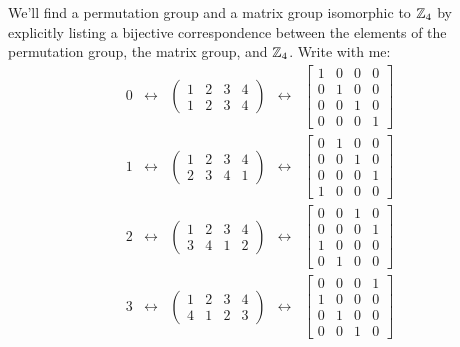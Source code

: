 \documentclass{ximera}
\begin{document}
\begin{example}
  We'll find a permutation group and a matrix group isomorphic to
  $\mathbb Z_4$ by explicitly listing a bijective correspondence between the
  elements of the permutation group, the matrix group, and $\mathbb Z_4$.
  Write with me:
  \[
  \renewcommand{\arraystretch}{2.5}
  \begin{array}{ccccc}
    0 & \leftrightarrow & \left(\begin{smallmatrix}1 & 2 & 3 & 4 \\ 1 & 2 & 3 & 4\end{smallmatrix}\right) & \leftrightarrow & \left[\begin{smallmatrix} 1 & 0 & 0 & 0 \\ 0 & 1 & 0 & 0 \\ 0 & 0 & 1 & 0 \\ 0 & 0 & 0 & 1 \end{smallmatrix}\right]\\
    1 & \leftrightarrow & \left(\begin{smallmatrix}1 & 2 & 3 & 4 \\ 2 & 3 & 4 & 1\end{smallmatrix}\right) & \leftrightarrow & \left[\begin{smallmatrix} 0 & 1 & 0 & 0 \\ 0 & 0 & 1 & 0 \\ 0 & 0 & 0 & 1 \\ 1 & 0 & 0 & 0 \end{smallmatrix}\right]\\
    2 & \leftrightarrow & \left(\begin{smallmatrix}1 & 2 & 3 & 4 \\ 3 & 4 & 1 & 2\end{smallmatrix}\right) & \leftrightarrow & \left[\begin{smallmatrix} 0 & 0 & 1 & 0 \\ 0 & 0 & 0 & 1 \\ 1 & 0 & 0 & 0 \\ 0 & 1 & 0 & 0 \end{smallmatrix}\right]\\
    3 & \leftrightarrow & \left(\begin{smallmatrix}1 & 2 & 3 & 4 \\ 4 & 1 & 2 & 3\end{smallmatrix}\right) & \leftrightarrow & \left[\begin{smallmatrix} 0 & 0 & 0 & 1 \\ 1 & 0 & 0 & 0 \\ 0 & 1 & 0 & 0 \\ 0 & 0 & 1 & 0 \end{smallmatrix}\right]\\
  \end{array}
  \]
\end{example}
\end{document}
